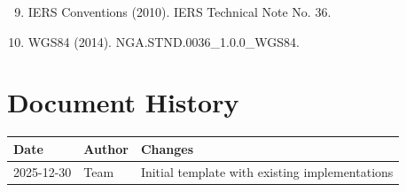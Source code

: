 \documentclass[11pt]{article}
\begin{document}
\begin{enumerate}[label=\arabic*.]
\setcounter{enumi}{8}
\item IERS Conventions (2010). IERS Technical Note No. 36.
\item WGS84 (2014). NGA.STND.0036\_1.0.0\_WGS84.
\end{enumerate}

\section*{Document History}

\begin{tabular}{@{}lll@{}}
\toprule
Date & Author & Changes \\
\midrule
2025-12-30 & Team & Initial template with existing implementations \\
\bottomrule
\end{tabular}
\end{document}

